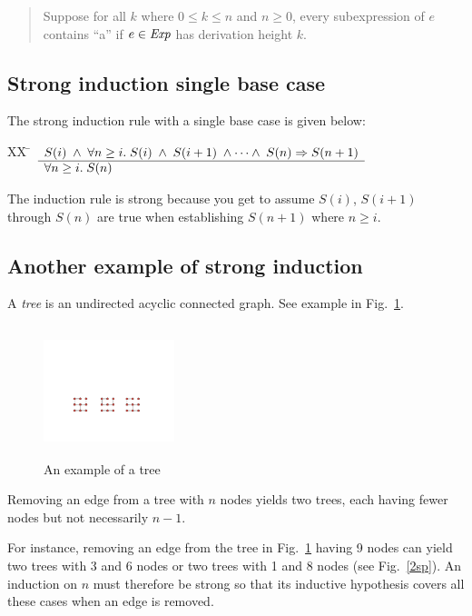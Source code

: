 \documentclass[12pt]{article}
\newcommand{\id}[1]{\mbox{\it #1\/}}
\begin{document}
\begin{quote}
Suppose for all $k$ where $0\leq k\leq n$ and $n\geq 0$,
every subexpression of $e$ contains ``a'' if $e\in\id{Exp}$ has derivation height $k$.
\end{quote}

\subsection{Strong induction single base case}

The strong induction rule with a single base case is given below:
\begin{tabbing}
[2]XX \=  \kill
[2] \>
	\(\begin{array}[t]{l}
	S(i) \;\wedge\; \forall n \geq i.\;S(i)\;\wedge\;S(i+1)\;\wedge\cdots\wedge\;S(n) \Rightarrow S(n+1) \\
	\hline
	\forall n \geq i. \; S(n)
	\end{array}\)
\end{tabbing}
The induction rule is strong because you get to assume
$S(i)$, $S(i+1)$ through $S(n)$ are true when establishing $S(n+1)$ where $n\geq i$.

\subsection{Another example of strong induction}

\noindent A {\em tree\/} is an undirected acyclic connected graph.
See example in Fig.\ \ref{sp}.

\begin{figure}[h]
\centering
\includegraphics[width=1.5in, height=1.5in,keepaspectratio=true]{tree.pdf}
\caption{An example of a tree}
\label{sp}
\end{figure}

\vspace{0.5em}

\noindent Removing an edge from a tree with $n$ nodes yields two trees, each 
having fewer nodes but not necessarily $n-1$.

\vspace{0.5em}
\noindent For instance, removing an edge from the tree in Fig.\ \ref{sp} having 9 nodes can yield 
two trees with 3 and 6 nodes or two trees with 1 and 8 nodes (see Fig.~\ref{2sp}).
An induction on $n$ must therefore be strong so that its inductive hypothesis
covers all these cases when an edge is removed.
\end{document}
